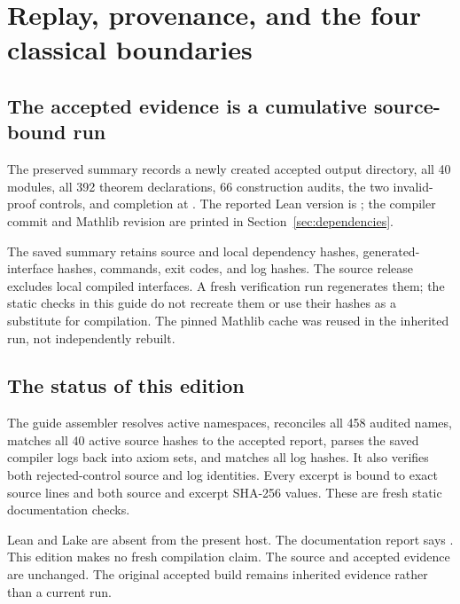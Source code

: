\section{Replay, provenance, and the four classical boundaries}
\subsection{The accepted evidence is a cumulative source-bound run}
The preserved summary  records a newly created accepted output directory, all 40 modules, all 392 theorem declarations, 66 construction audits, the two invalid-proof controls, and completion at . The reported Lean version is ; the compiler commit and Mathlib revision are printed in Section~\ref{sec:dependencies}.

The saved summary retains source and local dependency hashes, generated-interface hashes, commands, exit codes, and log hashes. The source release excludes local compiled interfaces. A fresh verification run regenerates them; the static checks in this guide do not recreate them or use their hashes as a substitute for compilation. The pinned Mathlib cache was reused in the inherited run, not independently rebuilt.

\subsection{The status of this edition}
The guide assembler resolves active namespaces, reconciles all 458 audited names, matches all 40 active source hashes to the accepted report, parses the saved compiler logs back into axiom sets, and matches all log hashes. It also verifies both rejected-control source and log identities. Every excerpt is bound to exact source lines and both source and excerpt SHA-256 values. These are fresh static documentation checks.

Lean and Lake are absent from the present host. The documentation report says . This edition makes no fresh compilation claim. The source and accepted evidence are unchanged. The original accepted build remains inherited evidence rather than a current run.

